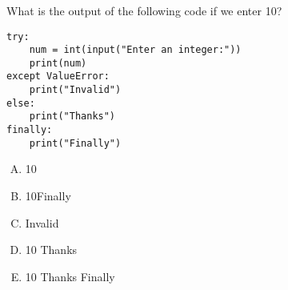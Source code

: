 \documentclass[xcolor=svgnames]{beamer}
\newcommand{\ft}[1]{\frametitle{#1}}
\begin{document}

\begin{frame}[fragile]\ft{}
  \begin{example}
  What is the output of the following code if we enter 10?
\begin{Verbatim}
try:
    num = int(input("Enter an integer:"))
    print(num)
except ValueError:
    print("Invalid")
else:
    print("Thanks")
finally:
    print("Finally")
\end{Verbatim}
\begin{multicols}{5}
\begin{enumerate}[A)]
\item 10 \newline\newline
\item 10\newline Finally \newline
\item Invalid\newline\newline
\item 10 \newline Thanks \newline
\item 10 \newline Thanks \newline Finally
\end{enumerate}
\end{multicols}
  \end{example} 
\end{frame}


\end{document}
